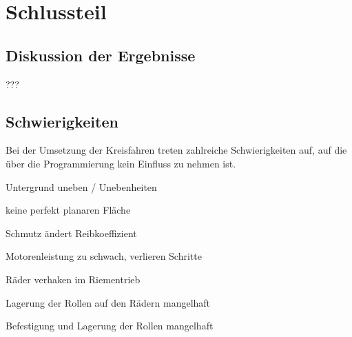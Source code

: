 \documentclass[a4paper]{article}
\begin{document}
\section{Schlussteil}
\subsection{Diskussion der Ergebnisse}
???

\subsection{Schwierigkeiten}
Bei der Umsetzung der Kreisfahren treten zahlreiche Schwierigkeiten auf, auf die über die Programmierung kein Einfluss zu nehmen ist.
\begin{compactitem}
    \item Untergrund uneben / Unebenheiten
    \item keine perfekt planaren Fläche
    \item Schmutz ändert Reibkoeffizient
    \item Motorenleistung zu schwach, verlieren Schritte
    \item Räder verhaken im Riementrieb
    \item Lagerung der Rollen auf den Rädern mangelhaft
    \item Befestigung und Lagerung der Rollen mangelhaft
\end{compactitem}
\end{document}
